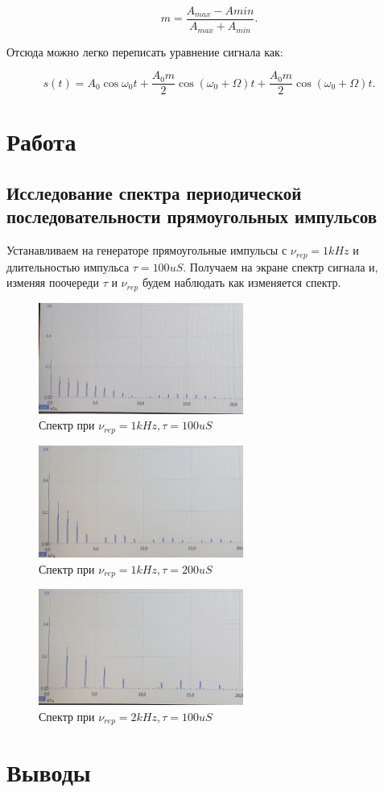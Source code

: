 \documentclass{article}
\begin{document}
\[ m = \frac{A_{max} - A{min}}{A_{max} + A_{min}}. \]

Отсюда можно легко переписать уравнение сигнала как:

\[ s(t) = A_0 \cos \omega_0t + \frac{A_0m}{2} \cos \left(\omega_0 + \Omega\right)t  + \frac{A_0m}{2} 
\cos \left(\omega_0 + \Omega\right)t.\]

\section{Работа}

\subsection{Исследование спектра периодической последовательности прямоугольных импульсов}

Устанавливаем на генераторе прямоугольные импульсы с \( \nu_{rep} = 1kHz \) и длительностью импульса
\( \tau = 100uS \). Получаем на экране спектр сигнала и, изменяя поочереди $\tau$ и $\nu_{rep}$ будем
наблюдать как изменяется спектр.

\begin{figure}[H]
    \centering
    \includegraphics[width=0.6\textwidth]{1.jpg}
    \caption{Спектр при \( \nu_{rep} = 1 kHz, \tau = 100uS \)}
    \label{spec_1}
\end{figure}

\begin{figure}[H]
    \centering
    \includegraphics[width=0.6\textwidth]{2.jpg}
    \caption{Спектр при \( \nu_{rep} = 1 kHz, \tau = 200uS \)} 
    \label{spec_2}
\end{figure}

\begin{figure}[H]
    \centering
    \includegraphics[width=0.6\textwidth]{3.jpg}
    \caption{Спектр при \( \nu_{rep} = 2 kHz, \tau = 100uS \)} 
    \label{spec_3}
\end{figure}


\section{Выводы}
\end{document}
